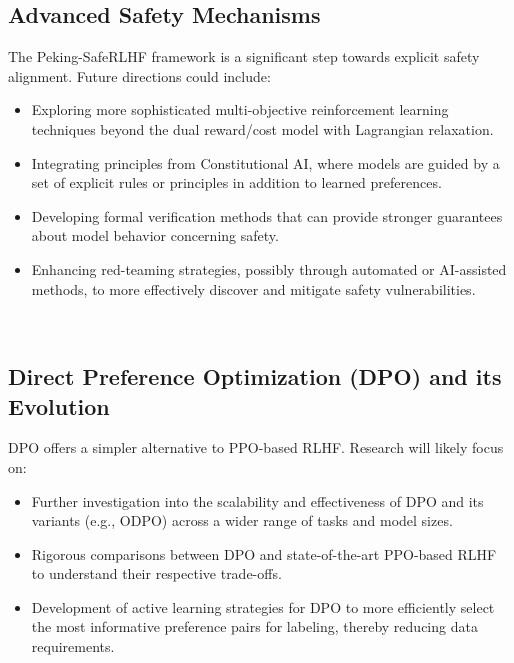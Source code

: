 \documentclass[10pt,journal,compsoc]{IEEEtran} %
\begin{document}
\subsection{Advanced Safety Mechanisms}
The Peking-SafeRLHF framework  is a significant step towards explicit safety alignment. Future directions could include:
\begin{itemize}
\item Exploring more sophisticated multi-objective reinforcement learning techniques beyond the dual reward/cost model with Lagrangian relaxation.
\item Integrating principles from Constitutional AI, where models are guided by a set of explicit rules or principles in addition to learned preferences.
\item Developing formal verification methods that can provide stronger guarantees about model behavior concerning safety.
\item Enhancing red-teaming strategies, possibly through automated or AI-assisted methods, to more effectively discover and mitigate safety vulnerabilities.
\end{itemize}  

\subsection{Direct Preference Optimization (DPO) and its Evolution}
DPO offers a simpler alternative to PPO-based RLHF. Research will likely focus on:
\begin{itemize}
\item Further investigation into the scalability and effectiveness of DPO and its variants (e.g., ODPO) across a wider range of tasks and model sizes.
\item Rigorous comparisons between DPO and state-of-the-art PPO-based RLHF to understand their respective trade-offs.
\item Development of active learning strategies for DPO to more efficiently select the most informative preference pairs for labeling, thereby reducing data requirements.
\end{itemize}  
\end{document}
